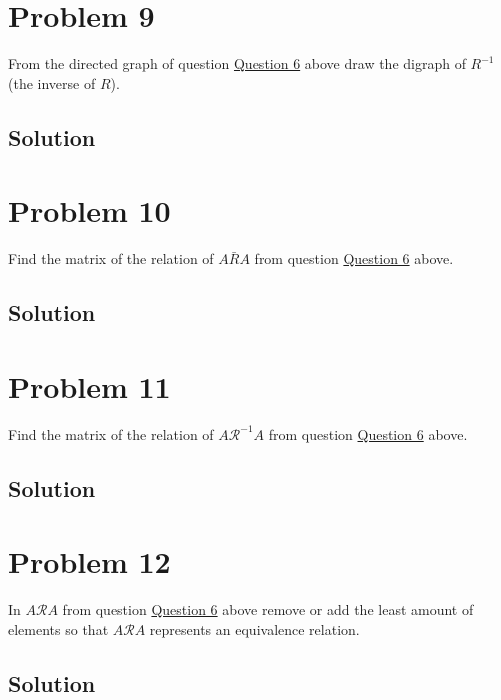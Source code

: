 \documentclass[article, 12pt]{article}
\theoremstyle{definition}
\newcommand{\rel}{\mathcal{R}} %
\begin{document}
    \section*{Problem 9}
    From the directed graph of question \hyperref[question]{Question 6} above draw the digraph of $R^{-1}$ (the inverse of $R$).
    \subsection*{Solution}
    \pagebreak
    \section*{Problem 10}
    Find the matrix of the relation of $A{\bar R}A$  from question \hyperref[question]{Question 6} above.
    \subsection*{Solution}
    \pagebreak
    \section*{Problem 11}
    Find the matrix of the relation of $A \rel^{-1}A$ from question \hyperref[question]{Question 6} above.
    \subsection*{Solution}
    \pagebreak
    \section*{Problem 12}
    In $A \rel A$ from question \hyperref[question]{Question 6} above remove or add the least amount of  elements so that $A \rel A$ represents an equivalence relation.
    \subsection*{Solution}
\end{document}

